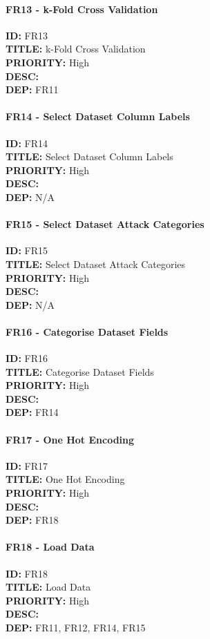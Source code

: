\paragraph*{FR13 - k-Fold Cross Validation}
\textbf{ID:} FR13 \\
\textbf{TITLE:} k-Fold Cross Validation \\
\textbf{PRIORITY:} High \\
\textbf{DESC:}   \\
\textbf{DEP:} FR11
\paragraph*{FR14 - Select Dataset Column Labels}
\textbf{ID:} FR14 \\
\textbf{TITLE:} Select Dataset Column Labels \\
\textbf{PRIORITY:} High \\
\textbf{DESC:}   \\
\textbf{DEP:} N/A
\paragraph*{FR15 - Select Dataset Attack Categories}
\textbf{ID:} FR15 \\
\textbf{TITLE:} Select Dataset Attack Categories \\
\textbf{PRIORITY:} High \\
\textbf{DESC:}   \\
\textbf{DEP:} N/A
\paragraph*{FR16 - Categorise Dataset Fields}
\textbf{ID:} FR16 \\
\textbf{TITLE:} Categorise Dataset Fields \\
\textbf{PRIORITY:} High \\
\textbf{DESC:}   \\
\textbf{DEP:} FR14
\paragraph*{FR17 - One Hot Encoding}
\textbf{ID:} FR17 \\
\textbf{TITLE:} One Hot Encoding \\
\textbf{PRIORITY:} High \\
\textbf{DESC:}  \\
\textbf{DEP:} FR18
\paragraph*{FR18 - Load Data}
\textbf{ID:} FR18 \\
\textbf{TITLE:} Load Data \\
\textbf{PRIORITY:} High \\
\textbf{DESC:}   \\
\textbf{DEP:} FR11, FR12, FR14, FR15
